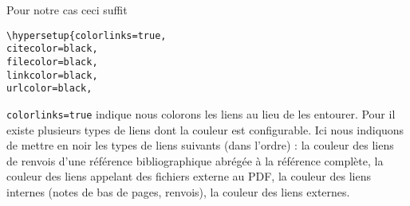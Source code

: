 Pour notre cas ceci suffit
\begin{verbatim}
\hypersetup{colorlinks=true,
citecolor=black,
filecolor=black,
linkcolor=black,
urlcolor=black,
\end{verbatim}

\verb|colorlinks=true| indique nous colorons les liens au lieu de les entourer. Pour  il existe plusieurs types de liens dont la couleur est configurable. Ici nous indiquons de mettre en noir les types de liens suivants (dans l'ordre) : la couleur des liens de renvois d'une référence bibliographique abrégée à la référence complète, la couleur des liens appelant des fichiers externe au PDF, la couleur des liens internes (notes de bas de pages, renvois), la couleur des liens externes.

